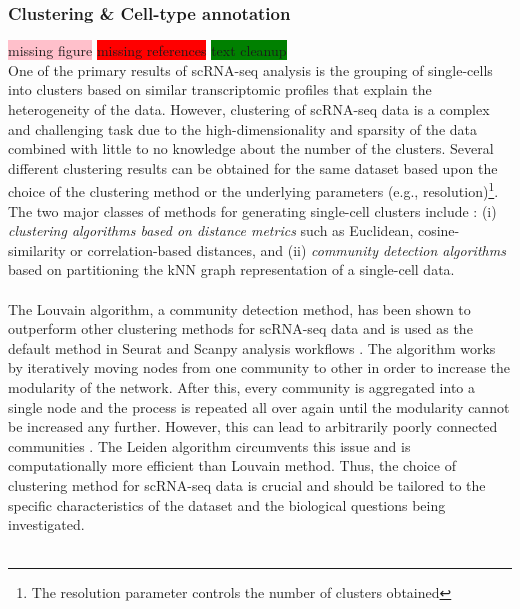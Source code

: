 \subsubsection{Clustering \& Cell-type annotation}
 \colorbox{pink}{missing figure}  \colorbox{red}{missing references}  \colorbox{green}{text cleanup}\\
One of the primary results of scRNA-seq analysis is the grouping of single-cells into clusters based on similar transcriptomic profiles that explain the heterogeneity of the data. However, clustering of scRNA-seq data is a complex and challenging task due to the high-dimensionality and sparsity of the data combined with little to no knowledge about the number of the clusters. Several different clustering results can be obtained for the same dataset based upon the choice of the clustering method or the underlying parameters (e.g., resolution)\footnote{The resolution parameter controls the number of clusters obtained}. The two major classes of methods for generating single-cell clusters include : (i) \textit{clustering algorithms based on distance metrics} such as Euclidean, cosine-similarity or correlation-based distances, and (ii) \textit{community detection algorithms} based on partitioning the kNN graph representation of a single-cell data.\\\\
The Louvain algorithm, a community detection method, has been shown to outperform other clustering methods for scRNA-seq data and is used as the default method in Seurat and Scanpy analysis workflows \textbf{\cite{lueckenmalte_d_current_2019,heumos_best_2023,duo_systematic_2020,freytag_comparison_2018}}. The algorithm works by iteratively moving nodes from one community to other in order to increase the modularity of the network. After this, every community is aggregated into a single node and the process is repeated all over again until the modularity cannot be increased any further. However, this can lead to arbitrarily poorly connected communities \textbf{\cite{heumos_best_2023,traag_louvain_2019}}. The Leiden algorithm \textbf{\cite{traag_louvain_2019}} circumvents this issue and is computationally more efficient than Louvain method. Thus, the choice of clustering method for scRNA-seq data is crucial and should be tailored to the specific characteristics of the dataset and the biological questions being investigated.\\\\
